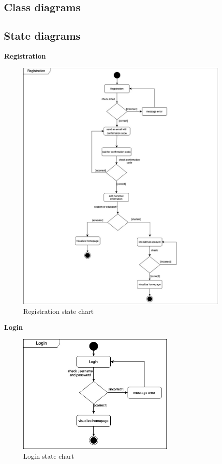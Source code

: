 \subsection{Class diagrams}

\subsection{State diagrams}
\textbf{Registration}\\
\begin{figure} [H]
  \centering
  \includegraphics[width=0.95\textwidth]{images/Registration.jpg}
  \caption{Registration state chart}
\end{figure} \vspace{1cm}

\textbf{Login}\\
\begin{figure} [H]
  \centering
  \includegraphics[width=0.7\textwidth]{images/Login.jpg}
  \caption{Login state chart}
\end{figure} \vspace{1cm}

